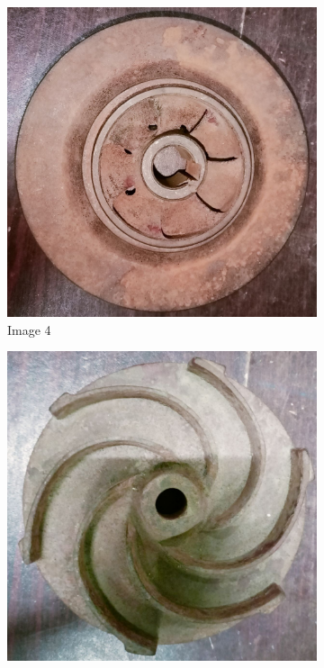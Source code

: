\documentclass[12pt]{article}
\begin{document}
\begin{figure}
  \begin{subfigure}{0.3\textwidth}
      \includegraphics[width=\linewidth]{img/04.jpg}
      \caption{Image 4}
  \end{subfigure}
  \hfill
  \begin{subfigure}{0.3\textwidth}
      \includegraphics[width=\linewidth]{img/05.jpg}

\end{subfigure}
\end{figure}
\end{document}
